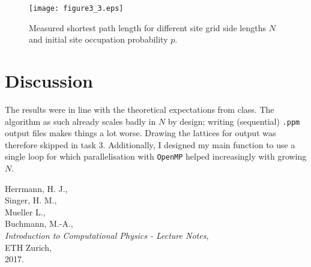 \documentclass[11pt,a4paper]{article}
\begin{document}
\begin{figure}[ht]
\begin{center}
\texttt{[image: figure3\_3.eps]} 
\end{center}
\caption{Measured shortest path length for different site grid side lengths $N$ and initial site occupation probability $p$.}
\label{fig3_3}
\end{figure}


\section{Discussion}
The results were in line with the theoretical expectations from class. The algorithm as such already scales badly in $N$ by design; writing (sequential) \texttt{.ppm} output files makes things a lot worse. Drawing the lattices for output was therefore skipped in task 3. Additionally, I designed my main function to use a single loop for which parallelisation with \texttt{OpenMP} helped increasingly with growing $N$.

\begin{thebibliography}{99}

	Herrmann, H. J.,\\
	Singer, H. M.,\\
	Mueller L.,\\
	Buchmann, M.-A.,\\
	\emph{Introduction to Computational Physics - Lecture Notes},\\
	ETH Zurich,\\
	2017.
\end{thebibliography}
\end{document}
